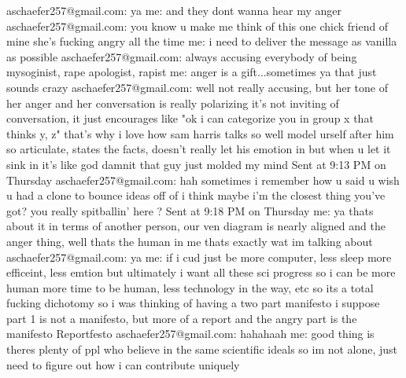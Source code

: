 aschaefer257@gmail.com:  ya
 me:  and they dont wanna hear my anger
 aschaefer257@gmail.com:  you know u make me think of this one chick friend of mine
she's fucking angry all the time
 me:  i need to deliver the message as vanilla as possible
 aschaefer257@gmail.com:  always accusing everybody of being mysoginist, rape apologist, rapist
 me:  anger is a gift...sometimes
ya that just sounds crazy
 aschaefer257@gmail.com:  well not really accusing, but her tone of her anger and her conversation is really polarizing
it's not inviting of conversation, it just encourages like "ok i can categorize you in group x that thinks y, z"
that's why i love how sam harris talks so well
model urself after him
so articulate, states the facts, doesn't really let his emotion in
but when u let it sink in it's like god damnit that guy just molded my mind
 Sent at 9:13 PM on Thursday
 aschaefer257@gmail.com:  hah
sometimes i remember how u said u wish u had a clone to bounce ideas off of
i think maybe i'm the closest thing you've got? you really spitballin' here ?
 Sent at 9:18 PM on Thursday
 me:  ya thats about it
in terms of another person, our ven diagram is nearly aligned
and the anger thing, well thats the human in me
thats exactly wat im talking about
 aschaefer257@gmail.com:  ya
 me:  if i cud just be more computer, less sleep
more efficeint, less emtion
but ultimately i want all these sci progress so i can be more human
more time to be human, less technology in the way, etc
so its a total fucking dichotomy
so i was thinking of having a two part manifesto
i suppose part 1 is not a manifesto, but more of a report
and the angry part is the manifesto
Reportfesto
 aschaefer257@gmail.com:  hahahaah
 me:  good thing is theres plenty of ppl who believe in the same scientific ideals
so im not alone, just need to figure out how i can contribute uniquely

